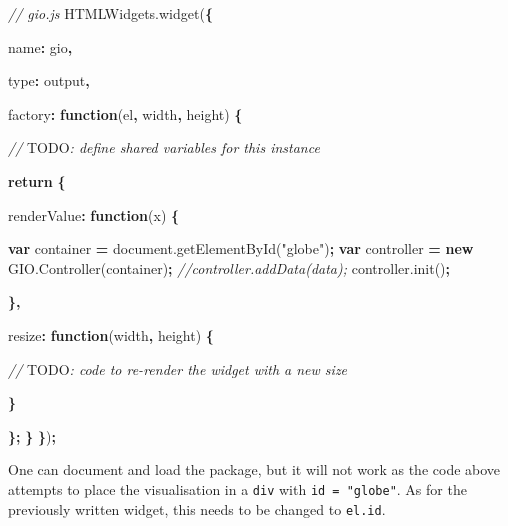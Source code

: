 \documentclass[
  10pt,
]{krantz}
\makeatletter
\newenvironment{Shaded}{\begin{snugshade}}{\end{snugshade}}
\newcommand{\AlertTok}[1]{\textcolor[rgb]{0.33,0.33,0.33}{#1}}
\newcommand{\AttributeTok}[1]{\textcolor[rgb]{0.61,0.61,0.61}{#1}}
\newcommand{\CommentTok}[1]{\textcolor[rgb]{0.37,0.37,0.37}{\textit{#1}}}
\newcommand{\ControlFlowTok}[1]{\textcolor[rgb]{0.27,0.27,0.27}{\textbf{#1}}}
\newcommand{\DataTypeTok}[1]{\textcolor[rgb]{0.27,0.27,0.27}{#1}}
\newcommand{\KeywordTok}[1]{\textcolor[rgb]{0.27,0.27,0.27}{\textbf{#1}}}
\newcommand{\NormalTok}[1]{#1}
\newcommand{\OperatorTok}[1]{\textcolor[rgb]{0.43,0.43,0.43}{\textbf{#1}}}
\newcommand{\StringTok}[1]{\textcolor[rgb]{0.5,0.5,0.5}{#1}}
\newcommand{\VariableTok}[1]{\textcolor[rgb]{0,0,0}{#1}}
\newenvironment{kframe}{%
\medskip{}
\setlength{\fboxsep}{.8em}
 \def\at@end@of@kframe{}%
 \ifinner\ifhmode%
  \def\at@end@of@kframe{\end{minipage}}%
  \begin{minipage}{\columnwidth}%
 \fi\fi%
 \def\FrameCommand##1{\hskip\@totalleftmargin \hskip-\fboxsep
 \colorbox{shadecolor}{##1}\hskip-\fboxsep
     \hskip-\linewidth \hskip-\@totalleftmargin \hskip\columnwidth}%
 \MakeFramed {\advance\hsize-\width
   \@totalleftmargin\z@ \linewidth\hsize
   \@setminipage}}%
 {\par\unskip\endMakeFramed%
 \at@end@of@kframe}
\renewenvironment{Shaded}{\begin{kframe}}{\end{kframe}}
\makeatother
\begin{document}
\begin{Shaded}
\begin{Highlighting}[]
\CommentTok{// gio.js}
\VariableTok{HTMLWidgets}\NormalTok{.}\AttributeTok{widget}\NormalTok{(}\OperatorTok{\{}

  \DataTypeTok{name}\OperatorTok{:} \StringTok{\textquotesingle{}gio\textquotesingle{}}\OperatorTok{,}

  \DataTypeTok{type}\OperatorTok{:} \StringTok{\textquotesingle{}output\textquotesingle{}}\OperatorTok{,}

  \DataTypeTok{factory}\OperatorTok{:} \KeywordTok{function}\NormalTok{(el}\OperatorTok{,}\NormalTok{ width}\OperatorTok{,}\NormalTok{ height) }\OperatorTok{\{}

    \CommentTok{// }\AlertTok{TODO}\CommentTok{: define shared variables for this instance}

    \ControlFlowTok{return} \OperatorTok{\{}

      \DataTypeTok{renderValue}\OperatorTok{:} \KeywordTok{function}\NormalTok{(x) }\OperatorTok{\{}

        \KeywordTok{var}\NormalTok{ container }\OperatorTok{=} \VariableTok{document}\NormalTok{.}\AttributeTok{getElementById}\NormalTok{(}\StringTok{"globe"}\NormalTok{)}\OperatorTok{;}
        \KeywordTok{var}\NormalTok{ controller }\OperatorTok{=} \KeywordTok{new} \VariableTok{GIO}\NormalTok{.}\AttributeTok{Controller}\NormalTok{(container)}\OperatorTok{;}
        \CommentTok{//controller.addData(data);}
        \VariableTok{controller}\NormalTok{.}\AttributeTok{init}\NormalTok{()}\OperatorTok{;}

      \OperatorTok{\},}

      \DataTypeTok{resize}\OperatorTok{:} \KeywordTok{function}\NormalTok{(width}\OperatorTok{,}\NormalTok{ height) }\OperatorTok{\{}

        \CommentTok{// }\AlertTok{TODO}\CommentTok{: code to re{-}render the widget with a new size}

      \OperatorTok{\}}

    \OperatorTok{\};}
  \OperatorTok{\}}
\OperatorTok{\}}\NormalTok{)}\OperatorTok{;}
\end{Highlighting}
\end{Shaded}

One can document and load the package, but it will not work as the code above attempts to place the visualisation in a \texttt{div} with \texttt{id\ =\ "globe"}. As for the previously written widget, this needs to be changed to \texttt{el.id}.
\end{document}
